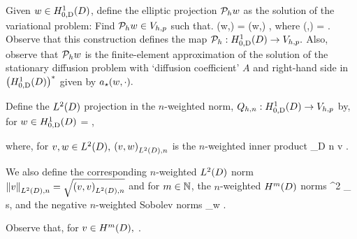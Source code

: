 Given $w \in \HozDD$, define the elliptic projection $\mathcal P_{h} w$ as the solution of the variational problem: Find $\mathcal P_{h} w \in V_{h,p}$ such that.
\beq\label{eq:epdef}
\aep(\Ph w,\vh) = \aep(w,\vh) \tforall \vh \in \Vhp,
  \eeq
  where
  \beq\label{eq:aepdef}
  \aep(\vo,\vt) = .
  \eeq
  Observe that this construction defines the map $\Ph:\HozDD \rightarrow \Vhp.$ Also, observe that $\mathcal P_{h} w$ is the finite-element approximation of the solution of the stationary diffusion problem with `diffusion coefficient' $A$ and right-hand side in $\HozDDs$ given by $a_{\star}(w,\cdot).$
  
Define the $\LtD$ projection in the $n$-weighted norm, $\Qhn:\HozDD\rightarrow \Vhp$ by, for $w \in \HozDD$
\beqs
{} =  \tforall \vh \in \Vhp,
\eeqs

where, for $v,w \in \LtD,$ $\IPLtDn{v}{w}$ is the $n$-weighted inner product
\beqs
{} \de \int_{D} n v \wbar.
\eeqs

We also define the corresponding $n$-weighted $\LtD$ norm $\NLtDn{v} = \sqrt{\IPLtDn{v}{v}}$ and for $m \in \mathbb N$, the $n$-weighted $\HmD$ norms
\beqs
{}^2 \de \sum_{\alpha \st \abs{\alpha} \leq s},
\eeqs
and the negative $n$-weighted Sobolev norms
\beq\label{eq:negweightnorm}
 \de \sup_{w \in \HmD} .
\eeq

Observe that, for $v \in \HmD,$
\beq\label{eq:nconv}
\nmin{} \leq {} \leq \nmax {}.
\eeq

